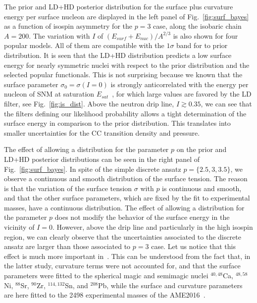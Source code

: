 The prior and LD+HD posterior distribution for the
surface plus curvature energy per surface nucleon are displayed in the left 
panel of Fig.~\ref{fig:surf_bayes} as a function of isospin asymmetry for the 
$p=3$ case, along the isobaric chain $A=200$. 
The variation with $I$ of $(E_{surf} + E_{nuc})/A^{2/3}$ is also shown for 
four popular models. All of them are compatible with the $1\sigma$ band 
for to prior distribution.
It is seen that the LD+HD distribution predicts a low surface energy for 
nearly symmetric nuclei with respect to the prior distribution and the 
selected popular functionals. This is not surprising because we known that the 
surface parameter $\sigma_0=\sigma(I=0)$ is strongly anticorrelated with the 
energy per nucleon of SNM at saturation $E_{sat}$~\cite{Carreau2019cc}, for 
which large values are favored by the LD filter, see Fig.~\ref{fig:is_dist}.
Above the neutron drip line, $I \gtrsim 0.35$, we can see that the filters 
defining our likelihood probability allows a tight determination of the 
surface energy in comparison to the prior distribution. This translates into
smaller uncertainties for the CC transition density and pressure.

The effect of allowing a distribution for the parameter $p$ on the 
prior and LD+HD posterior distributions can be seen in the right panel of 
Fig.~\ref{fig:surf_bayes}. In spite of the simple discrete ansatz
$p=\{2.5,3,3.5\}$, we observe a continuous and smooth distribution of the
surface tension. The reason is that the variation of the surface tension 
$\sigma$ with $p$ is continuous and smooth, and that the other surface
parameters, which are fixed by the fit to experimental masses, have a
continuous distribution. The effect of allowing a distribution for the
parameter $p$ does not modify the behavior of the surface energy in the
vicinity of $I=0$. However, above the drip line and particularly in the high
isospin region, we can clearly observe that the uncertainties associated to 
the discrete ansatz are larger than those associated to $p=3$ case. 
Let us notice that this effect is much more important in~\cite{Carreau2019cc}.
This can be understood from the fact that, in the latter study, curvature terms 
were not accounted for, and that the surface parameters were fitted
to the spherical magic and semimagic nuclei $^{40,48}$Ca, $^{48,58}$Ni,
$^{88}$Sr, $^{90}$Zr, $^{114,132}$Sn, and $^{208}$Pb, while the surface and 
curvature parameters are here fitted to the 2498 experimental masses of the 
AME2016~\cite{Huang2017}.

